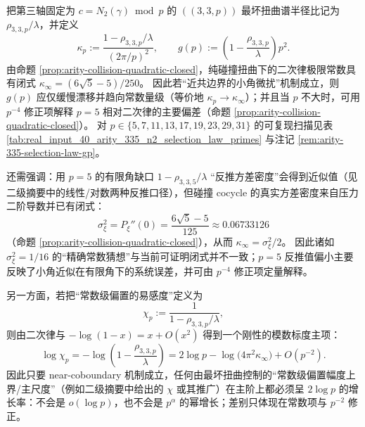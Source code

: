 \begin{remark}\label{rem:arity-335-near-coboundary-scaling}
把第三轴固定为 $c=N_2(\gamma)\bmod p$ 的 \(((3,3,p))\) 最坏扭曲谱半径比记为 \(\rho_{3,3,p}/\lambda\)，并定义
\[
\kappa_p:=\frac{1-\rho_{3,3,p}/\lambda}{(2\pi/p)^2},
\qquad
g(p):=\left(1-\frac{\rho_{3,3,p}}{\lambda}\right)p^2.
\]
由命题 \ref{prop:arity-collision-quadratic-closed}，纯碰撞扭曲下的二次律极限常数具有闭式
\(
\kappa_\infty=(6\sqrt5-5)/250
\)。
因此若“近共边界的小角微扰”机制成立，则 \(g(p)\) 应仅缓慢漂移并趋向常数量级（等价地 \(\kappa_p\to\kappa_\infty\)）；并且当 \(p\) 不大时，可用 \(p^{-4}\) 修正项解释 \(p=5\) 相对二次律的主要偏差（命题 \ref{prop:arity-collision-quadratic-closed}）。
对 \(p\in\{5,7,11,13,17,19,23,29,31\}\) 的可复现扫描见表 \ref{tab:real_input_40_arity_335_n2_selection_law_primes} 与注记 \ref{rem:arity-335-selection-law-gp}。
\par
还需强调：用 \(p=5\) 的有限角缺口 \(1-\rho_{3,3,5}/\lambda\) “反推方差密度”会得到近似值（见二级摘要中的线性/对数两种反推口径），但碰撞 cocycle 的真实方差密度来自压力二阶导数并已有闭式：
\[
\sigma_\xi^2=P_\xi''(0)=\frac{6\sqrt5-5}{125}\approx 0.06733126
\]
（命题 \ref{prop:arity-collision-quadratic-closed}），从而 \(\kappa_\infty=\sigma_\xi^2/2\)。
因此诸如 \(\sigma_\xi^2=1/16\) 的“精确常数猜想”与当前可证明闭式并不一致；\(p=5\) 反推值偏小主要反映了小角近似在有限角下的系统误差，并可由 \(p^{-4}\) 修正项定量解释。
\par
另一方面，若把“常数级偏置的易感度”定义为
\[
\chi_p:=\frac{1}{1-\rho_{3,3,p}/\lambda},
\]
则由二次律与 \(-\log(1-x)=x+O(x^2)\) 得到一个刚性的模数标度主项：
\[
\log\chi_p
=-\log\!\left(1-\frac{\rho_{3,3,p}}{\lambda}\right)
=2\log p-\log\!\bigl(4\pi^2\kappa_\infty\bigr)+O(p^{-2}).
\]
因此只要 near-coboundary 机制成立，任何由最坏扭曲控制的“常数级偏置幅度上界/主尺度”（例如二级摘要中给出的 \(\chi\) 或其推广）在主阶上都必须呈 \(2\log p\) 的增长率：不会是 \(o(\log p)\)，也不会是 \(p^\alpha\) 的幂增长；差别只体现在常数项与 \(p^{-2}\) 修正。
\end{remark}

